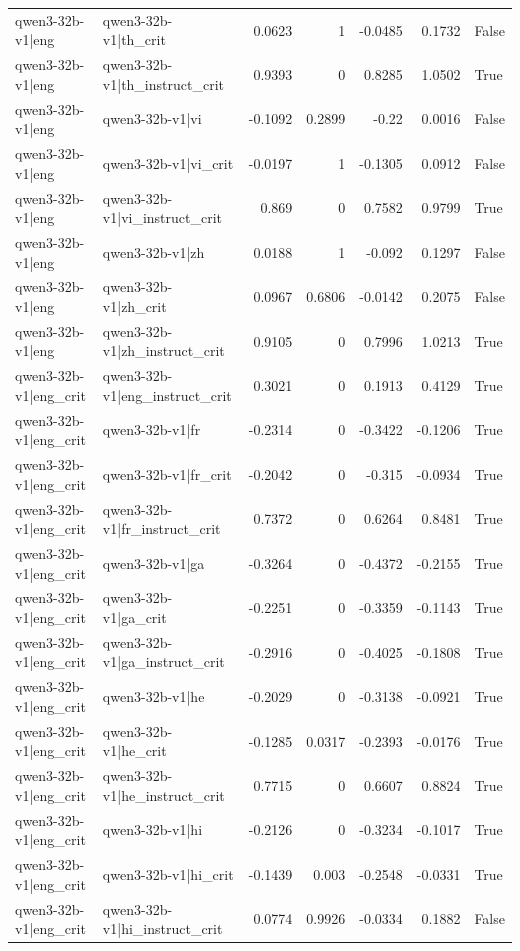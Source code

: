 \begin{table}
\begin{tabular}{l l r r r r l}
qwen3-32b-v1|eng & qwen3-32b-v1|th_crit & 0.0623 & 1 & -0.0485 & 0.1732 & False \\
qwen3-32b-v1|eng & qwen3-32b-v1|th_instruct_crit & 0.9393 & 0 & 0.8285 & 1.0502 & True \\
qwen3-32b-v1|eng & qwen3-32b-v1|vi & -0.1092 & 0.2899 & -0.22 & 0.0016 & False \\
qwen3-32b-v1|eng & qwen3-32b-v1|vi_crit & -0.0197 & 1 & -0.1305 & 0.0912 & False \\
qwen3-32b-v1|eng & qwen3-32b-v1|vi_instruct_crit & 0.869 & 0 & 0.7582 & 0.9799 & True \\
qwen3-32b-v1|eng & qwen3-32b-v1|zh & 0.0188 & 1 & -0.092 & 0.1297 & False \\
qwen3-32b-v1|eng & qwen3-32b-v1|zh_crit & 0.0967 & 0.6806 & -0.0142 & 0.2075 & False \\
qwen3-32b-v1|eng & qwen3-32b-v1|zh_instruct_crit & 0.9105 & 0 & 0.7996 & 1.0213 & True \\
qwen3-32b-v1|eng_crit & qwen3-32b-v1|eng_instruct_crit & 0.3021 & 0 & 0.1913 & 0.4129 & True \\
qwen3-32b-v1|eng_crit & qwen3-32b-v1|fr & -0.2314 & 0 & -0.3422 & -0.1206 & True \\
qwen3-32b-v1|eng_crit & qwen3-32b-v1|fr_crit & -0.2042 & 0 & -0.315 & -0.0934 & True \\
qwen3-32b-v1|eng_crit & qwen3-32b-v1|fr_instruct_crit & 0.7372 & 0 & 0.6264 & 0.8481 & True \\
qwen3-32b-v1|eng_crit & qwen3-32b-v1|ga & -0.3264 & 0 & -0.4372 & -0.2155 & True \\
qwen3-32b-v1|eng_crit & qwen3-32b-v1|ga_crit & -0.2251 & 0 & -0.3359 & -0.1143 & True \\
qwen3-32b-v1|eng_crit & qwen3-32b-v1|ga_instruct_crit & -0.2916 & 0 & -0.4025 & -0.1808 & True \\
qwen3-32b-v1|eng_crit & qwen3-32b-v1|he & -0.2029 & 0 & -0.3138 & -0.0921 & True \\
qwen3-32b-v1|eng_crit & qwen3-32b-v1|he_crit & -0.1285 & 0.0317 & -0.2393 & -0.0176 & True \\
qwen3-32b-v1|eng_crit & qwen3-32b-v1|he_instruct_crit & 0.7715 & 0 & 0.6607 & 0.8824 & True \\
qwen3-32b-v1|eng_crit & qwen3-32b-v1|hi & -0.2126 & 0 & -0.3234 & -0.1017 & True \\
qwen3-32b-v1|eng_crit & qwen3-32b-v1|hi_crit & -0.1439 & 0.003 & -0.2548 & -0.0331 & True \\
qwen3-32b-v1|eng_crit & qwen3-32b-v1|hi_instruct_crit & 0.0774 & 0.9926 & -0.0334 & 0.1882 & False \\

\end{tabular}
\end{table}
